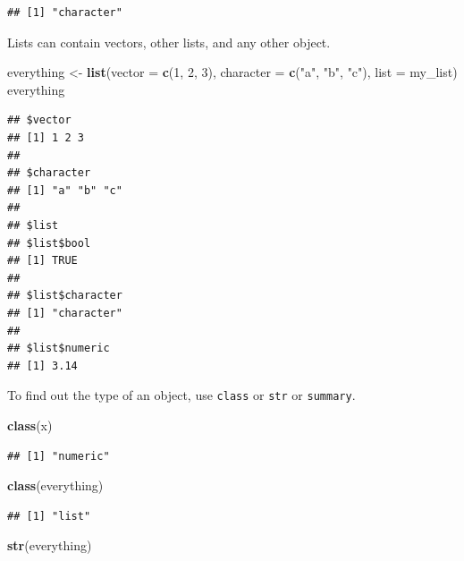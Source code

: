 \documentclass[openany]{book}
\newenvironment{Shaded}{\begin{snugshade}}{\end{snugshade}}
\newcommand{\DataTypeTok}[1]{\textcolor[rgb]{0.13,0.29,0.53}{#1}}
\newcommand{\DecValTok}[1]{\textcolor[rgb]{0.00,0.00,0.81}{#1}}
\newcommand{\KeywordTok}[1]{\textcolor[rgb]{0.13,0.29,0.53}{\textbf{#1}}}
\newcommand{\NormalTok}[1]{#1}
\newcommand{\StringTok}[1]{\textcolor[rgb]{0.31,0.60,0.02}{#1}}
\begin{document}
\begin{verbatim}
## [1] "character"
\end{verbatim}

Lists can contain vectors, other lists, and any other object.

\begin{Shaded}
\begin{Highlighting}[]
\NormalTok{everything <-}\StringTok{ }\KeywordTok{list}\NormalTok{(}\DataTypeTok{vector =} \KeywordTok{c}\NormalTok{(}\DecValTok{1}\NormalTok{, }\DecValTok{2}\NormalTok{, }\DecValTok{3}\NormalTok{), }
                   \DataTypeTok{character =} \KeywordTok{c}\NormalTok{(}\StringTok{"a"}\NormalTok{, }\StringTok{"b"}\NormalTok{, }\StringTok{"c"}\NormalTok{), }
                   \DataTypeTok{list =}\NormalTok{ my_list)}
\NormalTok{everything}
\end{Highlighting}
\end{Shaded}

\begin{verbatim}
## $vector
## [1] 1 2 3
## 
## $character
## [1] "a" "b" "c"
## 
## $list
## $list$bool
## [1] TRUE
## 
## $list$character
## [1] "character"
## 
## $list$numeric
## [1] 3.14
\end{verbatim}

To find out the type of an object, use \texttt{class} or \texttt{str} or \texttt{summary}.

\begin{Shaded}
\begin{Highlighting}[]
\KeywordTok{class}\NormalTok{(x)}
\end{Highlighting}
\end{Shaded}

\begin{verbatim}
## [1] "numeric"
\end{verbatim}

\begin{Shaded}
\begin{Highlighting}[]
\KeywordTok{class}\NormalTok{(everything)}
\end{Highlighting}
\end{Shaded}

\begin{verbatim}
## [1] "list"
\end{verbatim}

\begin{Shaded}
\begin{Highlighting}[]
\KeywordTok{str}\NormalTok{(everything)}
\end{Highlighting}
\end{Shaded}
\end{document}
